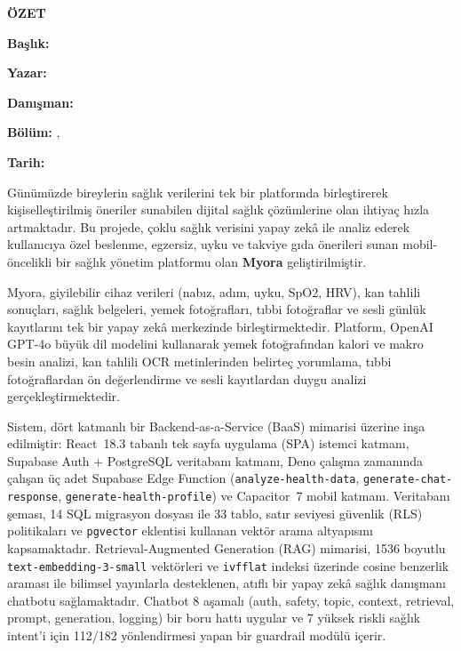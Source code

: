 \clearpage
\thispagestyle{empty}

\begin{center}
{\Large \textbf{ÖZET}}
\end{center}

\vspace{0.5cm}

\noindent\textbf{Başlık:} \ttitle

\noindent\textbf{Yazar:} \authorname

\noindent\textbf{Danışman:} \supname

\noindent\textbf{Bölüm:} \dept, \university

\noindent\textbf{Tarih:} \degreedate

\vspace{0.5cm}

Günümüzde bireylerin sağlık verilerini tek bir platformda birleştirerek kişiselleştirilmiş öneriler sunabilen dijital sağlık çözümlerine olan ihtiyaç hızla artmaktadır. Bu projede, çoklu sağlık verisini yapay zekâ ile analiz ederek kullanıcıya özel beslenme, egzersiz, uyku ve takviye gıda önerileri sunan mobil-öncelikli bir sağlık yönetim platformu olan \textbf{Myora} geliştirilmiştir.

Myora, giyilebilir cihaz verileri (nabız, adım, uyku, SpO2, HRV), kan tahlili sonuçları, sağlık belgeleri, yemek fotoğrafları, tıbbi fotoğraflar ve sesli günlük kayıtlarını tek bir yapay zekâ merkezinde birleştirmektedir. Platform, OpenAI GPT-4o büyük dil modelini kullanarak yemek fotoğrafından kalori ve makro besin analizi, kan tahlili OCR metinlerinden belirteç yorumlama, tıbbi fotoğraflardan ön değerlendirme ve sesli kayıtlardan duygu analizi gerçekleştirmektedir.

Sistem, dört katmanlı bir Backend-as-a-Service (BaaS) mimarisi üzerine inşa edilmiştir: React~18.3 tabanlı tek sayfa uygulama (SPA) istemci katmanı, Supabase Auth + PostgreSQL veritabanı katmanı, Deno çalışma zamanında çalışan üç adet Supabase Edge Function (\texttt{analyze-health-data}, \texttt{generate-chat-response}, \texttt{generate-health-profile}) ve Capacitor~7 mobil katmanı. Veritabanı şeması, 14 SQL migrasyon dosyası ile 33 tablo, satır seviyesi güvenlik (RLS) politikaları ve \texttt{pgvector} eklentisi kullanan vektör arama altyapısını kapsamaktadır. Retrieval-Augmented Generation (RAG) mimarisi, 1536 boyutlu \texttt{text-embedding-3-small} vektörleri ve \texttt{ivfflat} indeksi üzerinde cosine benzerlik araması ile bilimsel yayınlarla desteklenen, atıflı bir yapay zekâ sağlık danışmanı chatbotu sağlamaktadır. Chatbot 8 aşamalı (auth, safety, topic, context, retrieval, prompt, generation, logging) bir boru hattı uygular ve 7 yüksek riskli sağlık intent'i için 112/182 yönlendirmesi yapan bir guardrail modülü içerir.

